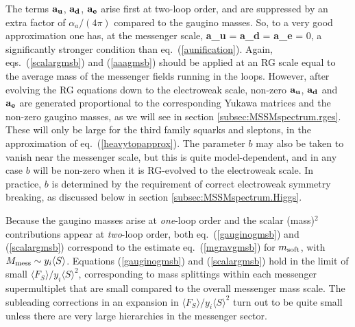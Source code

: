 The terms $\bf a_u$, $\bf a_d$, $\bf a_e$ arise
first at two-loop order, and are
suppressed by an extra factor of $\alpha_a/(4 \pi)$ compared
to the gaugino masses. So, to a very good approximation one has, at the
messenger scale,
\beq
{\bf a_u} = {\bf a_d} = {\bf a_e} = 0,
\label{aaagmsb}
\eeq
a significantly stronger condition than eq.~(\ref{aunification}).
Again, eqs.~(\ref{scalargmsb}) and (\ref{aaagmsb}) should be applied
at an RG scale equal to the average mass of the messenger fields
running in the loops.
However, after evolving the RG equations down to the
electroweak scale, non-zero $\bf a_u$, $\bf a_d$ and $\bf a_e$ are
generated proportional to the corresponding Yukawa matrices
and the non-zero gaugino masses, as we will see in section
\ref{subsec:MSSMspectrum.rges}.
These will only be large for the third family squarks and sleptons,
in the approximation of eq.~(\ref{heavytopapprox}). The parameter
$b$ may also be taken to vanish near the messenger scale, but this
is quite model-dependent, and in any case $b$ will be non-zero when it
is RG-evolved to the electroweak scale. In practice, $b$ is determined
by the requirement of correct electroweak symmetry breaking,
as discussed below in section \ref{subsec:MSSMspectrum.Higgs}.

Because the gaugino masses arise at {\it one}-loop order and the scalar
(mass)$^2$ contributions appear
at {\it two}-loop order, both
eq.~(\ref{gauginogmsb}) and (\ref{scalargmsb}) correspond to
the estimate eq.~(\ref{mgravgmsb}) for $m_{\rm soft}$, with $M_{\rm
mess} \sim y_i
\langle S \rangle$. Equations (\ref{gauginogmsb}) and (\ref{scalargmsb})
hold in the limit of small
$\langle F_S \rangle /y_i\langle S \rangle^2$, corresponding to
mass splittings within each messenger supermultiplet that are small
compared to the overall messenger mass scale. The subleading corrections
in an expansion in $\langle F_S \rangle /y_i\langle S \rangle^2$
turn out\cite{gmsbcorrections} to be
quite small unless there are very large hierarchies in the messenger
sector.

